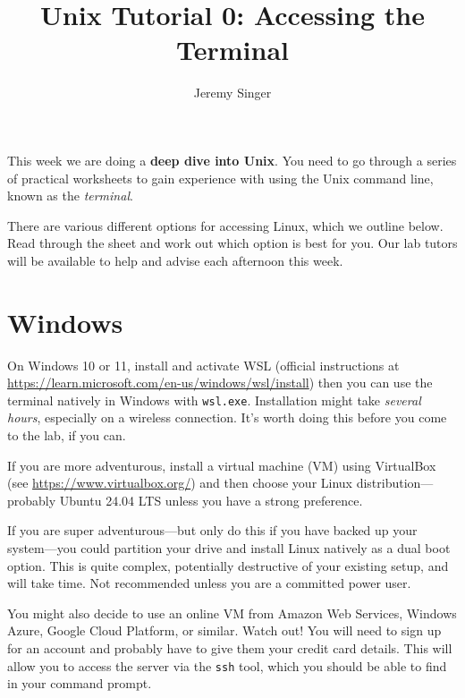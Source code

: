 \documentclass{article}
\begin{document}
\title{Unix Tutorial 0: Accessing the Terminal}
\author{Jeremy Singer}
\date{}
\maketitle





This week we are doing a \textbf{deep dive into Unix}.
You need to go
through a series of practical worksheets to gain experience with
using the Unix command line, known as the \emph{terminal}.

There are various different options for accessing Linux, which we outline
below. Read through the sheet and work out which option is best
for you. Our lab tutors will be available to help and advise each
afternoon this week.



\section*{Windows}

On Windows 10 or 11, install and activate WSL (official instructions at \url{https://learn.microsoft.com/en-us/windows/wsl/install}) then you can use the terminal natively in Windows with \texttt{wsl.exe}. Installation might take \emph{several hours}, especially on a wireless connection. It's worth doing this before you come to the lab, if you can.

If you are more adventurous, install a virtual machine (VM) using VirtualBox
(see \url{https://www.virtualbox.org/}) and then choose your Linux distribution---probably Ubuntu 24.04 LTS unless you have a strong preference.

If you are super adventurous---but only do this if you have backed up your system---you could partition your drive and install Linux natively as a dual boot option. This is quite complex, potentially destructive of your existing setup, and will take time. Not recommended unless you are a committed power user.

You might also decide to use an online VM from Amazon Web Services, Windows Azure, Google Cloud Platform,  or similar. Watch out! You will need to sign up for an account and probably have to give them your credit card details.
This will allow you to access the server via the \texttt{ssh} tool, which you should be able to find in your command prompt.
\end{document}
